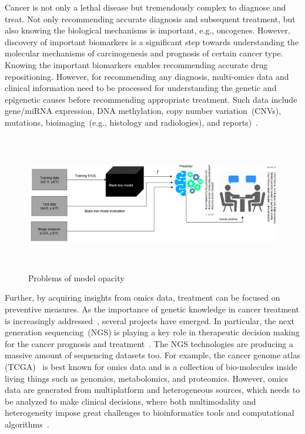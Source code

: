 \hspace*{3.5mm} Cancer is not only a lethal disease but tremendously complex to diagnose and treat. Not only recommending accurate diagnosis and subsequent treatment, but also knowing the biological mechanisms is important, e.g., oncogenes. However, discovery of important biomarkers is a significant step towards understanding the molecular mechanisms of carcinogenesis and prognosis of certain cancer type. Knowing the important biomarkers enables recommending accurate drug repositioning. However, for recommending any diagnosis, multi-omics data and clinical information need to be processed for understanding the genetic and epigenetic causes before recommending appropriate treatment. Such data include gene/miRNA expression, DNA methylation, copy number variation~(CNVs), mutations, bioimaging~(e.g., histology and radiologies), and reports)~\cite{22Ding, 23Zheng}.  

\begin{figure}[h]
	\centering
	\includegraphics[width=\linewidth,height=60mm]{images/bbm.png}
	\caption{Problems of model opacity}
    \label{fig:model_bbm}
    \vspace{-2mm}
\end{figure}

\hspace*{3.5mm} Further, by acquiring insights from omics data, treatment can be focused on preventive measures. As the importance of genetic knowledge in cancer treatment is increasingly addressed~\cite{15Wu}, several projects have emerged. In particular, the next generation sequencing~(NGS) is playing a key role in therapeutic decision making for the cancer prognosis and treatment~\cite{jha2017towards}. The NGS technologies are producing a massive amount of sequencing datasets too. For example, the cancer genome atlas (TCGA)~\cite{tomczak2015cancer} is best known for omics data and is a collection of bio-molecules inside living things such as genomics, metabolomics, and proteomics. However, omics data are generated from multiplatform and heterogeneous sources, which needs to be analyzed to make clinical decisions, where both multimodality and heterogeneity impose great challenges to bioinformatics tools and computational algorithms~\cite{karimACCESS2019,karimBIB2019}. 

